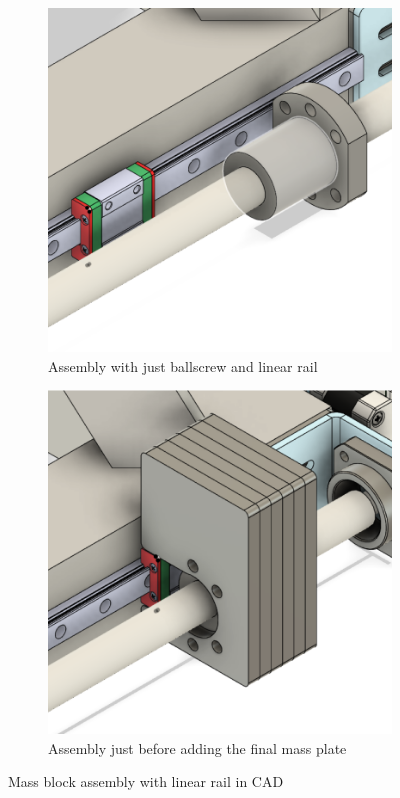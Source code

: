 \begin{figure}[h]
  \centering
  \begin{subfigure}[t]{0.45\textwidth}
    \includegraphics[width=\linewidth]{figures/linear_act_1.png}
    \caption{Assembly with just ballscrew and linear rail}
  \end{subfigure}\hfill
  \begin{subfigure}[t]{0.45\textwidth}
    \includegraphics[width=\linewidth]{figures/linear_act_2.png}
    \caption{Assembly just before adding the final mass plate}
  \end{subfigure}
  \caption{Mass block assembly with linear rail in CAD}
  \label{fig:linear_act}
\end{figure}

